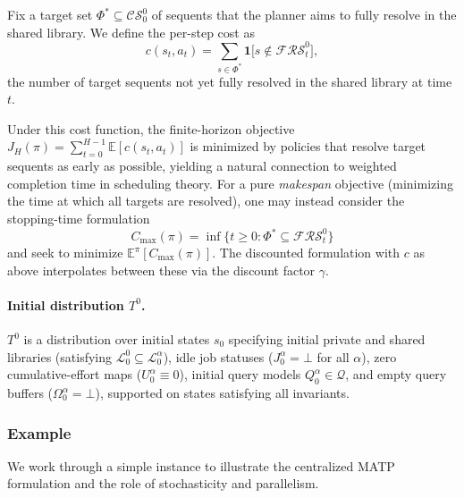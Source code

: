 Fix a target set $\Phi^*\subseteq \mathcal{CS}^0_0$ of sequents that the planner aims to fully resolve in the shared library. We define the per-step cost as
\[
c(s_t,a_t) = \sum_{s\in\Phi^*} \mathbf{1}\!\big[s\notin \mathcal{FRS}^0_t\big],
\]
the number of target sequents not yet fully resolved in the shared library at time $t$.
 
\begin{remark}
Under this cost function, the finite-horizon objective $J_H(\pi) = \sum_{t=0}^{H-1}\mathbb{E}[c(s_t,a_t)]$ is minimized by policies that resolve target sequents as early as possible, yielding a natural connection to weighted completion time in scheduling theory. For a pure \emph{makespan} objective (minimizing the time at which all targets are resolved), one may instead consider the stopping-time formulation
\[
C_{\max}(\pi) = \inf\!\big\{t\ge 0 : \Phi^*\subseteq \mathcal{FRS}^0_t\big\}
\]
and seek to minimize $\mathbb{E}^\pi[C_{\max}(\pi)]$. The discounted formulation with $c$ as above interpolates between these via the discount factor $\gamma$.
\end{remark}


\paragraph{Initial distribution $T^0$.}

$T^0$ is a distribution over initial states $s_0$ specifying initial private and shared libraries (satisfying $\mathcal{L}^0_0\subseteq\mathcal{L}^\alpha_0$), idle job statuses ($J^\alpha_0=\bot$ for all $\alpha$), zero cumulative-effort maps ($U^\alpha_0\equiv 0$), initial query models $Q^\alpha_0\in\mathcal{Q}$, and empty query buffers ($\Omega^\alpha_0=\bot$), supported on states satisfying all invariants.




\subsubsection{Example}\label{sec:matp-example}

We work through a simple instance to illustrate the centralized MATP formulation and the role of stochasticity and parallelism.

